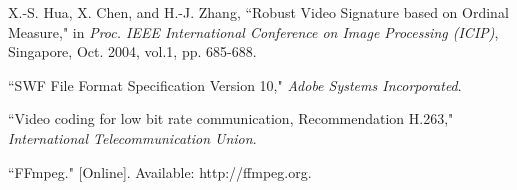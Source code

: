 \documentclass{article}
\begin{document}
\begin{thebibliography}{99}
X.-S. Hua, X. Chen, and H.-J. Zhang, ``Robust Video Signature based on Ordinal Measure," in \emph{Proc. IEEE International Conference on Image Processing (ICIP)}, Singapore, Oct. 2004, vol.1, pp. 685-688.

``SWF File Format Specification Version 10," \emph{Adobe Systems Incorporated}.

``Video coding for low bit rate communication, Recommendation H.263," \emph{International Telecommunication Union}.

``FFmpeg." [Online]. Available: http://ffmpeg.org.

\end{thebibliography}


\end{document}
